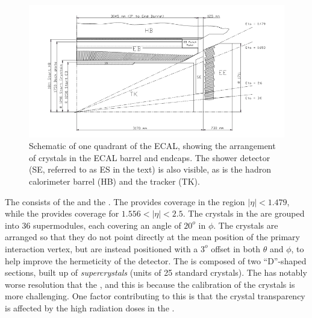 \begin{figure}[h]
\centering
\includegraphics[width=1.0\textwidth]{detectorFigures/ecalEBEE.png}
\caption{Schematic \crosssection of one quadrant of the ECAL, showing the arrangement of crystals in the ECAL barrel and endcaps. The shower detector (SE, referred to as ES in the text) is also visible, as is the hadron calorimeter barrel (HB) and the tracker (TK)\quad\cite{CMSEcalTDR}.}
\label{fig:ecal}
\end{figure}








The \ECAL consists of the \EB and the \EE. The \EB provides coverage in the region $|\eta| < 1.479$, while the \EE provides coverage for $1.556 < |\eta| < 2.5$. The crystals in the \EB are grouped into 36 supermodules, each covering an angle of $20^o$ in $\phi$. The crystals are arranged so that they do not point directly at the mean position of the primary interaction vertex, but are instead positioned with a $3^o$ offset in both $\theta$ and $\phi$, to help improve the hermeticity of the detector. The \EE is composed of two ``D''-shaped sections, built up of \emph{supercrystals} (units of 25 standard crystals). The \EE has notably worse resolution that the \EB, and this is because the calibration of the crystals is more challenging. One factor contributing to this is that the crystal transparency is affected by the high radiation doses in the \EE. %

